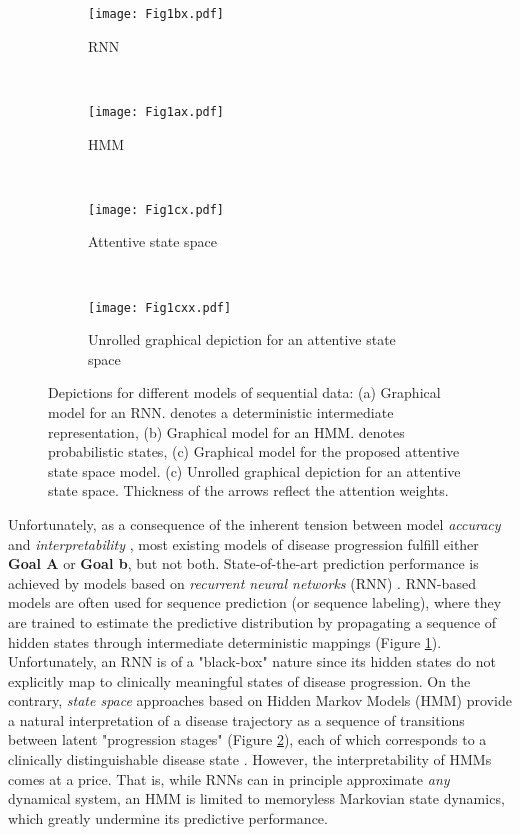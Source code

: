 \documentclass[twoside,11pt]{article}
\begin{document}
\begin{figure*}[t!] 
    \centering
    \begin{subfigure}[t]{0.32\textwidth}
        \centering
        \texttt{[image: Fig1bx.pdf]}
        \caption{\footnotesize RNN}
				\label{fig1a}
    \end{subfigure}~ 
    \begin{subfigure}[t]{0.32\textwidth}
        \centering
        \texttt{[image: Fig1ax.pdf]}
        \caption{\footnotesize HMM}
				\label{fig1b}
    \end{subfigure}
		 ~ 
    \begin{subfigure}[t]{0.32\textwidth}
        \centering
        \texttt{[image: Fig1cx.pdf]}
        \caption{\footnotesize Attentive state space}
				\label{fig1c}
		 \end{subfigure}		
				 ~ 
    \begin{subfigure}[t]{0.64\textwidth}
        \centering
        \texttt{[image: Fig1cxx.pdf]}
        \caption{\footnotesize Unrolled graphical depiction for an attentive state space}
				\label{fig1c2}
		 \end{subfigure}		
    \caption{\footnotesize Depictions for different models of sequential data: (a) Graphical model for an RNN.  denotes a deterministic intermediate representation, (b) Graphical model for an HMM.  denotes probabilistic states, (c) Graphical model for the proposed attentive state space model. (c) Unrolled graphical depiction for an attentive state space. Thickness of the arrows reflect the attention weights.}
\end{figure*}

Unfortunately, as a consequence of the inherent tension between model {\it accuracy} and {\it interpretability} \cite{lipton2016mythos}, most existing models of disease progression fulfill either {\bf Goal A} or {\bf Goal b}, but not both. State-of-the-art prediction performance is achieved by models based on {\it recurrent neural networks} (RNN) \cite{lim2018disease,lipton2015learning,choi2016doctor}. RNN-based models are often used for sequence prediction (or sequence labeling), where they are trained to estimate the predictive distribution \mbox{\footnotesize } by propagating a sequence of hidden states \mbox{\footnotesize } through intermediate deterministic mappings (Figure \ref{fig1a}). Unfortunately, an RNN is of a "black-box" nature since its hidden states \mbox{\footnotesize } do not explicitly map to clinically meaningful states of disease progression. On the contrary, {\it state space} approaches based on Hidden Markov Models (HMM) provide a natural interpretation of a disease trajectory as a sequence of transitions between latent "progression stages" \mbox{\footnotesize } (Figure \ref{fig1b}), each of which corresponds to a clinically distinguishable disease state \cite{alaa2016hidden,liu2015efficient,wang2014unsupervised}. However, the interpretability of HMMs comes at a price. That is, while RNNs can in principle approximate {\it any} dynamical system, an HMM is limited to memoryless Markovian state dynamics, which greatly undermine its predictive performance. 
\end{document}
